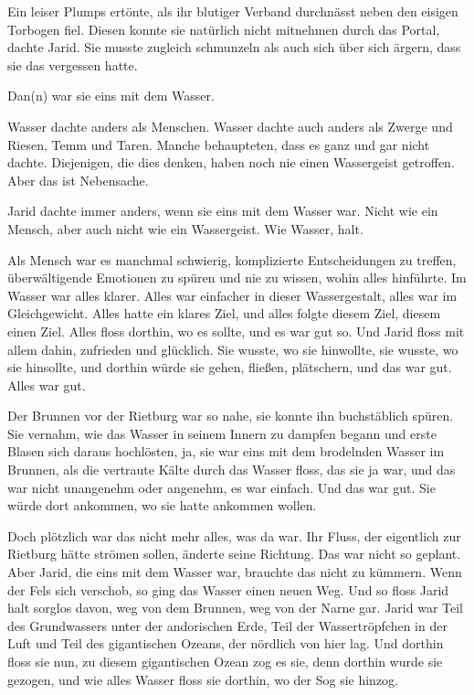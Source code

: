 Ein leiser Plumps ertönte, als ihr blutiger Verband durchnässt neben den eisigen Torbogen fiel. Diesen konnte sie natürlich nicht mitnehmen durch das Portal, dachte Jarid. Sie musste zugleich schmunzeln als auch sich über sich ärgern, dass sie das vergessen hatte.

Dan(n) war sie eins mit dem Wasser.



\trennzeichen



Wasser dachte anders als Menschen. Wasser dachte auch anders als Zwerge und Riesen, Temm und Taren. Manche behaupteten, dass es ganz und gar nicht dachte. Diejenigen, die dies denken, haben noch nie einen Wassergeist getroffen. Aber das ist Nebensache.

Jarid dachte immer anders, wenn sie eins mit dem Wasser war. Nicht wie ein Mensch, aber auch nicht wie ein Wassergeist. Wie Wasser, halt.

Als Mensch war es manchmal schwierig, komplizierte Entscheidungen zu treffen, überwältigende Emotionen zu spüren und nie zu wissen, wohin alles hinführte. Im Wasser war alles klarer. Alles war einfacher in dieser Wassergestalt, alles war im Gleichgewicht. Alles hatte ein klares Ziel, und alles folgte diesem Ziel, diesem einen Ziel. Alles floss dorthin, wo es sollte, und es war gut so. Und Jarid floss mit allem dahin, zufrieden und glücklich. Sie wusste, wo sie hinwollte, sie wusste, wo sie hinsollte, und dorthin würde sie gehen, fließen, plätschern, und das war gut. Alles war gut.

Der Brunnen vor der Rietburg war so nahe, sie konnte ihn buchstäblich spüren. Sie vernahm, wie das Wasser in seinem Innern zu dampfen begann und erste Blasen sich daraus hochlösten, ja, sie war eins mit dem brodelnden Wasser im Brunnen, als die vertraute Kälte durch das Wasser floss, das sie ja war, und das war nicht unangenehm oder angenehm, es war einfach. Und das war gut. Sie würde dort ankommen, wo sie hatte ankommen wollen.

Doch plötzlich war das nicht mehr alles, was da war. Ihr Fluss, der eigentlich zur Rietburg hätte strömen sollen, änderte seine Richtung. Das war nicht so geplant. Aber Jarid, die eins mit dem Wasser war, brauchte das nicht zu kümmern. Wenn der Fels sich verschob, so ging das Wasser einen neuen Weg. Und so floss Jarid halt sorglos davon, weg von dem Brunnen, weg von der Narne gar. Jarid war Teil des Grundwassers unter der andorischen Erde, Teil der Wassertröpfchen in der Luft und Teil des gigantischen Ozeans, der nördlich von hier lag. Und dorthin floss sie nun, zu diesem gigantischen Ozean zog es sie, denn dorthin wurde sie gezogen, und wie alles Wasser floss sie dorthin, wo der Sog sie hinzog.

